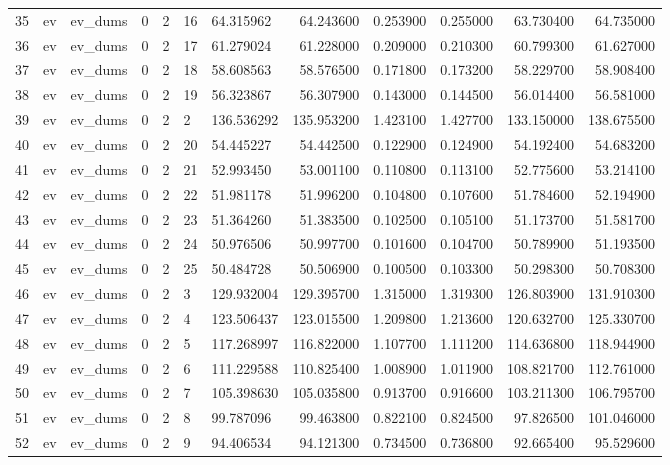 \begin{tabular}{lllllllrrrrr}
35 & ev & ev_dums & 0 & 2 & 16 & 64.315962 & 64.243600 & 0.253900 & 0.255000 & 63.730400 & 64.735000 \\
36 & ev & ev_dums & 0 & 2 & 17 & 61.279024 & 61.228000 & 0.209000 & 0.210300 & 60.799300 & 61.627000 \\
37 & ev & ev_dums & 0 & 2 & 18 & 58.608563 & 58.576500 & 0.171800 & 0.173200 & 58.229700 & 58.908400 \\
38 & ev & ev_dums & 0 & 2 & 19 & 56.323867 & 56.307900 & 0.143000 & 0.144500 & 56.014400 & 56.581000 \\
39 & ev & ev_dums & 0 & 2 & 2 & 136.536292 & 135.953200 & 1.423100 & 1.427700 & 133.150000 & 138.675500 \\
40 & ev & ev_dums & 0 & 2 & 20 & 54.445227 & 54.442500 & 0.122900 & 0.124900 & 54.192400 & 54.683200 \\
41 & ev & ev_dums & 0 & 2 & 21 & 52.993450 & 53.001100 & 0.110800 & 0.113100 & 52.775600 & 53.214100 \\
42 & ev & ev_dums & 0 & 2 & 22 & 51.981178 & 51.996200 & 0.104800 & 0.107600 & 51.784600 & 52.194900 \\
43 & ev & ev_dums & 0 & 2 & 23 & 51.364260 & 51.383500 & 0.102500 & 0.105100 & 51.173700 & 51.581700 \\
44 & ev & ev_dums & 0 & 2 & 24 & 50.976506 & 50.997700 & 0.101600 & 0.104700 & 50.789900 & 51.193500 \\
45 & ev & ev_dums & 0 & 2 & 25 & 50.484728 & 50.506900 & 0.100500 & 0.103300 & 50.298300 & 50.708300 \\
46 & ev & ev_dums & 0 & 2 & 3 & 129.932004 & 129.395700 & 1.315000 & 1.319300 & 126.803900 & 131.910300 \\
47 & ev & ev_dums & 0 & 2 & 4 & 123.506437 & 123.015500 & 1.209800 & 1.213600 & 120.632700 & 125.330700 \\
48 & ev & ev_dums & 0 & 2 & 5 & 117.268997 & 116.822000 & 1.107700 & 1.111200 & 114.636800 & 118.944900 \\
49 & ev & ev_dums & 0 & 2 & 6 & 111.229588 & 110.825400 & 1.008900 & 1.011900 & 108.821700 & 112.761000 \\
50 & ev & ev_dums & 0 & 2 & 7 & 105.398630 & 105.035800 & 0.913700 & 0.916600 & 103.211300 & 106.795700 \\
51 & ev & ev_dums & 0 & 2 & 8 & 99.787096 & 99.463800 & 0.822100 & 0.824500 & 97.826500 & 101.046000 \\
52 & ev & ev_dums & 0 & 2 & 9 & 94.406534 & 94.121300 & 0.734500 & 0.736800 & 92.665400 & 95.529600 \\

\end{tabular}
